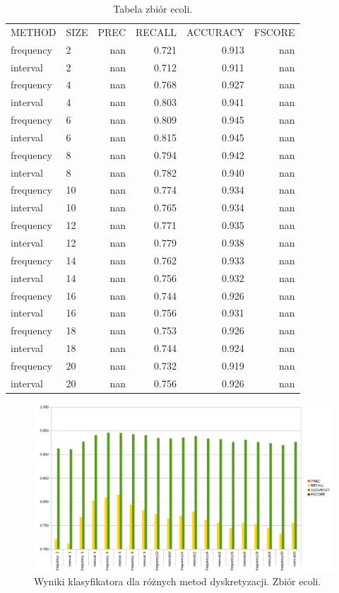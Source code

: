 \begin{table}[H]
\centering
\caption{Tabela zbiór ecoli.}
\label{table-ecoli}
\begin{tabular}{llrrrr}
METHOD    & SIZE & PREC & RECALL & ACCURACY & FSCORE \\
frequency & 2    & nan  & 0.721  & 0.913    & nan    \\
interval  & 2    & nan  & 0.712  & 0.911    & nan    \\
frequency & 4    & nan  & 0.768  & 0.927    & nan    \\
interval  & 4    & nan  & 0.803  & 0.941    & nan    \\
frequency & 6    & nan  & 0.809  & 0.945    & nan    \\
interval  & 6    & nan  & 0.815  & 0.945    & nan    \\
frequency & 8    & nan  & 0.794  & 0.942    & nan    \\
interval  & 8    & nan  & 0.782  & 0.940    & nan    \\
frequency & 10   & nan  & 0.774  & 0.934    & nan    \\
interval  & 10   & nan  & 0.765  & 0.934    & nan    \\
frequency & 12   & nan  & 0.771  & 0.935    & nan    \\
interval  & 12   & nan  & 0.779  & 0.938    & nan    \\
frequency & 14   & nan  & 0.762  & 0.933    & nan    \\
interval  & 14   & nan  & 0.756  & 0.932    & nan    \\
frequency & 16   & nan  & 0.744  & 0.926    & nan    \\
interval  & 16   & nan  & 0.756  & 0.931    & nan    \\
frequency & 18   & nan  & 0.753  & 0.926    & nan    \\
interval  & 18   & nan  & 0.744  & 0.924    & nan    \\
frequency & 20   & nan  & 0.732  & 0.919    & nan    \\
interval  & 20   & nan  & 0.756  & 0.926    & nan   
\end{tabular}
\end{table}
\begin{figure}[H]
	\centering
		\includegraphics[width=1.0\linewidth]{disc_ecoli.png}
	\caption[Wyniki klasyfikatora dla różnych metod dyskretyzacji. Zbiór ecoli.]{Wyniki klasyfikatora dla różnych metod dyskretyzacji. Zbiór ecoli.}
	\label{fig:disc_ecoli}
\end{figure}

